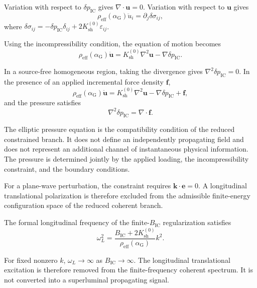 Variation with respect to $\delta p_{\mathrm{IC}}$ gives $\nabla\cdot\mathbf{u}=0$. Variation with respect to $\mathbf{u}$ gives
\begin{equation}
    \rho_{\mathrm{eff}}(\alpha_{\mathrm{G}}) \ddot{u}_i = \partial_j\delta\sigma_{ij},
\end{equation}
where $\delta\sigma_{ij} = -\delta p_{\mathrm{IC}}\delta_{ij} + 2K_{\mathrm{sh}}^{(0)} \varepsilon_{ij}$.

Using the incompressibility condition, the equation of motion becomes
\begin{equation}
    \rho_{\mathrm{eff}}(\alpha_{\mathrm{G}}) \ddot{\mathbf{u}} = K_{\mathrm{sh}}^{(0)} \nabla^2\mathbf{u} - \nabla\delta p_{\mathrm{IC}}.
\end{equation}

In a source-free homogeneous region, taking the divergence gives $\nabla^2\delta p_{\mathrm{IC}}=0$. In the presence of an applied incremental force density $\mathbf{f}$,
\begin{equation}
    \rho_{\mathrm{eff}}(\alpha_{\mathrm{G}}) \ddot{\mathbf{u}} = K_{\mathrm{sh}}^{(0)} \nabla^2\mathbf{u} - \nabla\delta p_{\mathrm{IC}} + \mathbf{f},
\end{equation}
and the pressure satisfies
\begin{equation}
    \boxed{ \nabla^2\delta p_{\mathrm{IC}} = \nabla\cdot\mathbf{f} }.
\end{equation}

The elliptic pressure equation is the compatibility condition of the reduced constrained branch. It does not define an independently propagating field and does not represent an additional channel of instantaneous physical information. The pressure is determined jointly by the applied loading, the incompressibility constraint, and the boundary conditions.

For a plane-wave perturbation, the constraint requires $\mathbf{k}\cdot\mathbf{e}=0$. A longitudinal translational polarization is therefore excluded from the admissible finite-energy configuration space of the reduced coherent branch.

The formal longitudinal frequency of the finite-$B_{\mathrm{IC}}$ regularization satisfies
\begin{equation}
    \omega_L^2 = \frac{ B_{\mathrm{IC}} + 2K_{\mathrm{sh}}^{(0)} }{ \rho_{\mathrm{eff}}(\alpha_{\mathrm{G}}) } k^2.
\end{equation}

For fixed nonzero $k$, $\omega_L\rightarrow\infty$ as $B_{\mathrm{IC}}\rightarrow\infty$. The longitudinal translational excitation is therefore removed from the finite-frequency coherent spectrum. It is not converted into a superluminal propagating signal.

